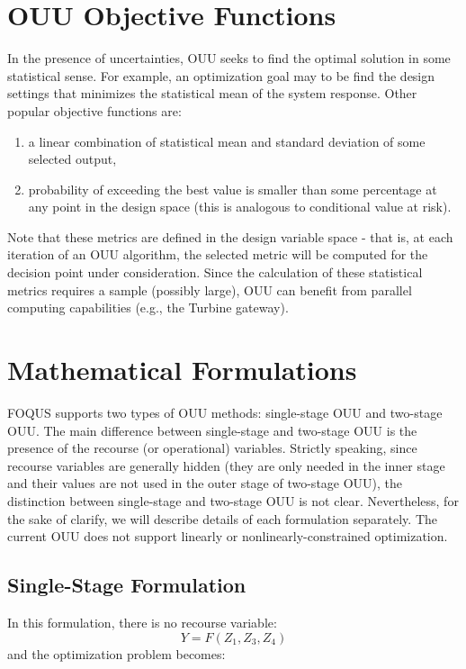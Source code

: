 \section{OUU Objective Functions}

In the presence of uncertainties, OUU seeks to find the
optimal solution in some statistical sense. For example,
an optimization goal may to be find the design settings
that minimizes the statistical mean of the system
response. Other popular objective functions are:
\begin{enumerate}
\item a linear combination of statistical mean and
      standard deviation of some selected output,
\item probability of exceeding the best value is smaller
      than some percentage at any point in the design
      space (this is analogous to conditional value at
      risk).
\end{enumerate}
Note that these metrics are defined in the design variable 
space - that is, at each iteration of an OUU algorithm, the
selected metric will be computed for the decision point
under consideration. Since the calculation of these
statistical metrics requires a sample (possibly large),
OUU can benefit from parallel computing capabilities
(e.g., the Turbine gateway).

\section{Mathematical Formulations}

FOQUS supports two types of OUU methods: single-stage
OUU and two-stage OUU. The main difference between
single-stage and two-stage OUU is the presence of the
recourse (or operational) variables.  Strictly speaking,
since recourse variables are generally hidden (they are
only needed in the inner stage and their values are not
used in the outer stage of two-stage OUU), the distinction
between single-stage and two-stage OUU is not clear.
Nevertheless, for the sake of clarify, we will describe
details of each formulation separately. The current
OUU does not support linearly or nonlinearly-constrained
optimization.

\subsection{Single-Stage Formulation}

In this formulation, there is no recourse variable: 
\begin{equation}
Y = F(Z_1, Z_3, Z_4)
\end{equation}
and the optimization problem becomes:

